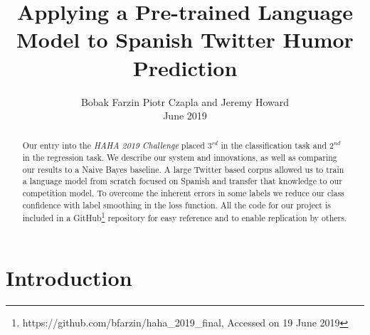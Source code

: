 \documentclass[runningheads]{llncs}
\begin{document}
\title{Applying a Pre-trained Language Model to Spanish Twitter Humor Prediction}
\author{Bobak Farzin  Piotr Czapla  and Jeremy Howard  \\June 2019}
%
%


\maketitle

\begin{abstract}
Our entry into the \textit{HAHA 2019 Challenge} placed $3^{rd}$ in the classification task and $2^{nd}$ in the regression task.  We describe our system and innovations, as well as comparing our results to a Naive Bayes baseline.
A large Twitter based corpus allowed us to train a language model from scratch focused on Spanish and transfer that knowledge to our competition model.  To overcome the inherent errors in some labels we reduce our class confidence with label smoothing in the loss function.
All the code for our project is included in a GitHub\footnote{https://github.com/bfarzin/haha\_2019\_final, Accessed on 19 June 2019} repository for easy reference and to enable replication by others.

\end{abstract}

\section{Introduction}
\label{intro}
\newcommand{\chapquote}[3]{\begin{quotation} \textit{#1} \end{quotation} \begin{flushright} - #2, \textit{#3}\end{flushright} }
\end{document}
